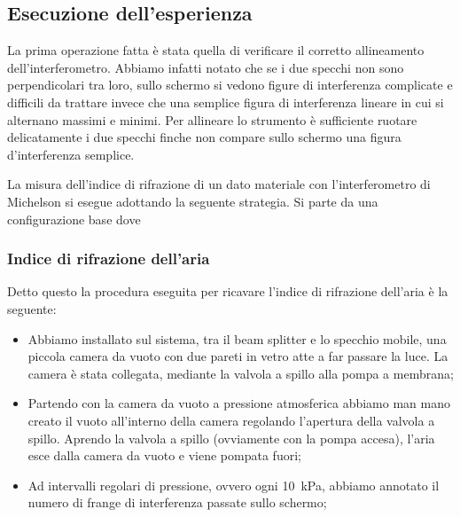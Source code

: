 \subsection{Esecuzione dell'esperienza}

La prima operazione fatta è stata quella di verificare il corretto allineamento dell'interferometro. Abbiamo infatti notato che se i due specchi non sono perpendicolari tra loro, sullo schermo si vedono figure di interferenza complicate e difficili da trattare invece che una semplice figura di interferenza lineare in cui si alternano massimi e minimi. Per allineare lo strumento è sufficiente ruotare delicatamente i due specchi finche non compare sullo schermo una figura d'interferenza semplice.


La misura dell'indice di rifrazione di un dato materiale con l'interferometro di Michelson si esegue adottando la seguente strategia.
Si parte da una configurazione base dove 

\subsubsection{Indice di rifrazione dell'aria}

Detto questo la procedura eseguita per ricavare l'indice di rifrazione dell'aria è la seguente:
\begin{itemize}
	\item{Abbiamo installato sul sistema, tra il beam splitter e lo specchio mobile, una piccola camera da vuoto con due pareti in vetro atte a far passare la luce. La camera è stata collegata, mediante la valvola a spillo alla pompa a membrana;} %
    \item{Partendo con la camera da vuoto a pressione atmosferica abbiamo man mano creato il vuoto all'interno della camera regolando l'apertura della valvola a spillo. Aprendo la valvola a spillo (ovviamente con la pompa accesa), l'aria esce dalla camera da vuoto e viene pompata fuori;}
    \item{Ad intervalli regolari di pressione, ovvero ogni \SI{10}{\kilo\pascal}, abbiamo annotato il numero di frange di interferenza passate sullo schermo;}
\end{itemize}

